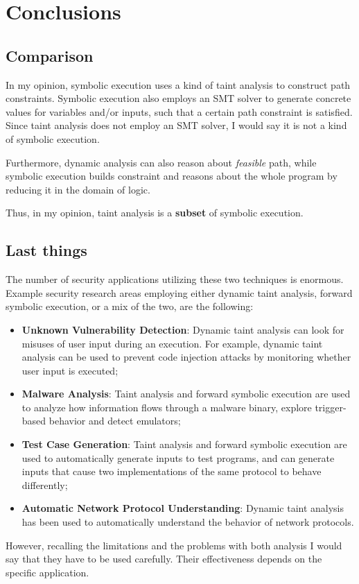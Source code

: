 \section{Conclusions}
\subsection{Comparison}
In my opinion, symbolic execution uses a kind of taint analysis to construct path constraints. Symbolic execution also employs an SMT solver to generate concrete values for variables and/or inputs, such that a certain path constraint is satisfied. Since taint analysis does not employ an SMT solver, I would say it is not a kind of symbolic execution.

Furthermore, dynamic analysis can also reason about \textit{feasible} path, while symbolic execution builds constraint and reasons about the whole program by reducing it in the domain of logic.

Thus, in my opinion, taint analysis is a \textbf{subset} of symbolic execution.

\subsection{Last things}
The number of security applications utilizing these two techniques is enormous. Example security research areas employing either dynamic taint analysis, forward symbolic execution, or a mix of the two, are the following:
\begin{itemize}
	\item \textbf{Unknown Vulnerability Detection}: Dynamic taint analysis can look for misuses of user input during an execution. For example, dynamic taint analysis can be used to prevent code injection attacks by monitoring whether user input is executed;
	\item \textbf{Malware Analysis}: Taint analysis and forward symbolic execution are used to analyze how information flows through a malware binary, explore trigger-based behavior and detect emulators;
	\item \textbf{Test Case Generation}: Taint analysis and forward symbolic execution are used to automatically generate inputs to test programs, and can generate inputs that cause two implementations of the same protocol to behave differently;
	\item \textbf{Automatic Network Protocol Understanding}: Dynamic taint analysis has been used to automatically understand the behavior of network protocols.
\end{itemize}

However, recalling the limitations and the problems with both analysis I would say that they have to be used carefully. Their effectiveness depends on the specific application.

